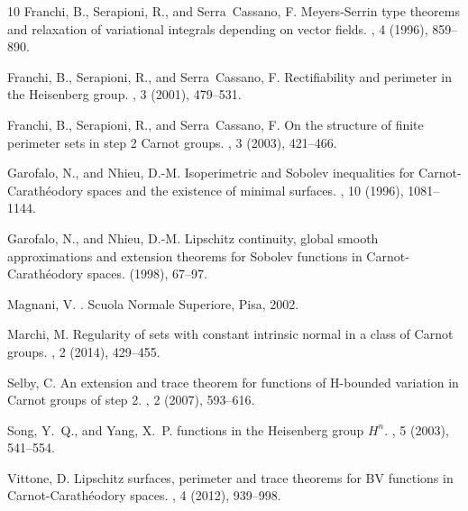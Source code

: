 \documentclass[12pt,a4paper]{amsart}
\theoremstyle{definition}
\theoremstyle{plain}
\begin{document}
\begin{thebibliography}{10}
{\sc Franchi, B., Serapioni, R., and Serra~Cassano, F.}
\newblock Meyers-{S}errin type theorems and relaxation of variational integrals depending on vector fields.
, 4 (1996), 859--890.

{\sc Franchi, B., Serapioni, R., and Serra~Cassano, F.}
\newblock Rectifiability and perimeter in the {H}eisenberg group.
, 3 (2001), 479--531.

{\sc Franchi, B., Serapioni, R., and Serra~Cassano, F.}
\newblock On the structure of finite perimeter sets in step 2 {C}arnot groups.
, 3 (2003), 421--466.

{\sc Garofalo, N., and Nhieu, D.-M.}
\newblock Isoperimetric and {S}obolev inequalities for {C}arnot-{C}arath\'eodory spaces and the existence of minimal surfaces.
, 10 (1996), 1081--1144.

{\sc Garofalo, N., and Nhieu, D.-M.}
\newblock Lipschitz continuity, global smooth approximations and extension theorems for {S}obolev functions in {C}arnot-{C}arath\'{e}odory spaces.
 (1998), 67--97.

{\sc Magnani, V.}
.
\newblock Scuola Normale Superiore, Pisa, 2002.

{\sc Marchi, M.}
\newblock Regularity of sets with constant intrinsic normal in a class of {C}arnot groups.
, 2 (2014), 429--455.

{\sc Selby, C.}
\newblock An extension and trace theorem for functions of {H}-bounded variation in {C}arnot groups of step 2.
, 2 (2007), 593--616.

{\sc Song, Y.~Q., and Yang, X.~P.}
 functions in the {H}eisenberg group {$H^n$}.
, 5 (2003), 541--554.

{\sc Vittone, D.}
\newblock Lipschitz surfaces, perimeter and trace theorems for {BV} functions in {C}arnot-{C}arath\'{e}odory spaces.
, 4 (2012), 939--998.

\end{thebibliography}
\end{document}
